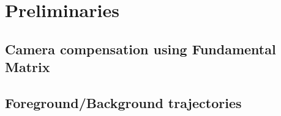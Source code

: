 \section{Preliminaries}
\label{preliminaries}
\subsection{Camera compensation using Fundamental Matrix}
\subsection{Foreground/Background trajectories}
